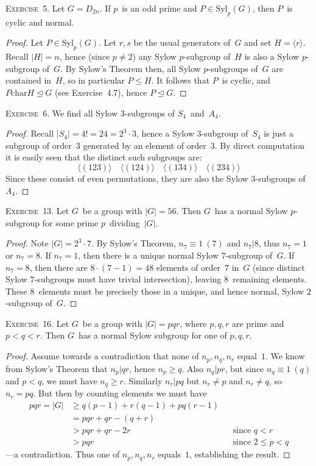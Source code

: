 \documentclass[letterpaper]{article}
\newcommand{\exercise}[1]{\goodbreak\noindent\textsc{Exercise~{#1}.}}
\newcommand{\subgroup}{\le}
\newcommand{\normal}{\trianglelefteq}
\newcommand{\chr}{\mathrel{\mathrm{char}}}
\newcommand{\syl}{\mathrm{Syl}}
\newcommand{\ord}[1]{|{#1}|}
\newcommand{\gen}[1]{\langle{#1}\rangle}
\begin{document}
\exercise{5}
Let $G=D_{2n}$. If $p$~is an odd prime and $P\in\syl_p(G)$, then $P$~is cyclic and normal.
\begin{proof}
Let $P\in\syl_p(G)$. Let $r,s$ be the usual generators of~$G$ and set $H=\gen{r}$. Recall $\ord{H}=n$, hence (since $p\ne2$) any Sylow $p$-subgroup of~$H$ is also a Sylow $p$-subgroup of~$G$. By Sylow's Theorem then, all Sylow $p$-subgroups of~$G$ are contained in~$H$, so in particular $P\subgroup H$. It follows that $P$~is cyclic, and $P\chr H\normal G$ (see Exercise~4.7), hence $P\normal G$.
\end{proof}

\exercise{6}
We find all Sylow $3$-subgroups of $S_4$~and~$A_4$.
\begin{proof}
Recall $\ord{S_4}=4!=24=2^3\cdot 3$, hence a Sylow $3$-subgroup of~$S_4$ is just a subgroup of order~$3$ generated by an element of order~$3$. By direct computation it is easily seen that the distinct such subgroups are:
$$\gen{(123)}\quad\gen{(124)}\quad\gen{(134)}\quad\gen{(234)}$$
Since these consist of even permutations, they are also the Sylow $3$-subgroups of~$A_4$.
\end{proof}

\exercise{13}
Let $G$~be a group with $\ord{G}=56$. Then $G$~has a normal Sylow $p$-subgroup for some prime $p$~dividing~$\ord{G}$.
\begin{proof}
Note $\ord{G}=2^3\cdot 7$. By Sylow's Theorem, $n_7\equiv1\ (7)$ and $n_7|8$, thus $n_7=1$ or $n_7=8$. If $n_7=1$, then there is a unique normal Sylow $7$-subgroup of~$G$. If $n_7=8$, then there are $8\cdot(7-1)=48$ elements of order~$7$ in~$G$ (since distinct Sylow $7$-subgroups must have trivial intersection), leaving $8$~remaining elements. These $8$~elements must be precisely those in a unique, and hence normal, Sylow $2$-subgroup of~$G$.
\end{proof}

\exercise{16}
Let $G$~be a group with $\ord{G}=pqr$, where $p,q,r$ are prime and $p<q<r$. Then $G$~has a normal Sylow subgroup for one of $p,q,r$.
\begin{proof}
Assume towards a contradiction that none of $n_p,n_q,n_r$ equal~$1$. We know from Sylow's Theorem that $n_p|qr$, hence $n_p\ge q$. Also $n_q|pr$, but since $n_q\equiv1\ (q)$ and $p<q$, we must have $n_q\ge r$. Similarly $n_r|pq$ but $n_r\ne p$ and $n_r\ne q$, so $n_r=pq$. But then by counting elements we must have
\begin{align*}
pqr=\ord{G}&\ge q(p-1)+r(q-1)+pq(r-1)&&\\
			&=pqr+qr-(q+r)&&\\
			&>pqr+qr-2r&&\text{since $q<r$}\\
			&>pqr&&\text{since $2\le p<q$}
\end{align*}
---a contradiction. Thus one of $n_p,n_q,n_r$ equals~$1$, establishing the result.
\end{proof}
\end{document}
